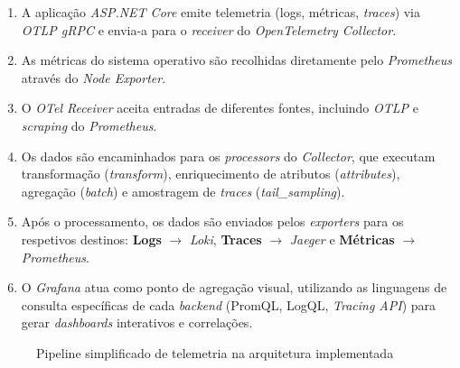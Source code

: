 \begin{enumerate}
    \item A aplicação \textit{ASP.NET Core} emite telemetria (logs, métricas, \textit{traces}) via \textit{OTLP gRPC} e envia-a para o \textit{receiver} do \textit{OpenTelemetry Collector}.
    \item As métricas do sistema operativo são recolhidas diretamente pelo \textit{Prometheus} através do \textit{Node Exporter}.
    \item O \textit{OTel Receiver} aceita entradas de diferentes fontes, incluindo \textit{OTLP} e \textit{scraping} do \textit{Prometheus}.
    \item Os dados são encaminhados para os \textit{processors} do \textit{Collector}, que executam transformação (\textit{transform}), enriquecimento de atributos (\textit{attributes}), agregação (\textit{batch}) e amostragem de \textit{traces} (\textit{tail\_sampling}).
    \item Após o processamento, os dados são enviados pelos \textit{exporters} para os respetivos destinos: \textbf{Logs} $\rightarrow$ \textit{Loki}, \textbf{Traces} $\rightarrow$ \textit{Jaeger} e \textbf{Métricas} $\rightarrow$ \textit{Prometheus}.
    \item O \textit{Grafana} atua como ponto de agregação visual, utilizando as linguagens de consulta específicas de cada \textit{backend} (PromQL, LogQL, \textit{Tracing API}) para gerar \textit{dashboards} interativos e correlações.
\end{enumerate}


\begin{figure}[H]
\centering
{}
\caption{Pipeline simplificado de telemetria na arquitetura implementada}
\label{fig:pipeline_otel}
\end{figure}

